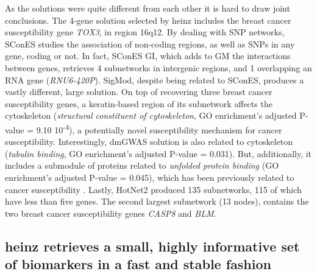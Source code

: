 \documentclass[twocolumn, 10pt]{article}
\begin{document}
As the solutions were quite different from each other it is hard to draw joint conclusions. The 4-gene solution selected by heinz includes the breast cancer susceptibility gene \emph{TOX3}, in region 16q12. By dealing with SNP networks, SConES studies the association of non-coding regions, as well as SNPs in any gene, coding or not. In fact, SConES GI, which adds to GM the interactions between genes, retrieves 4 subnetworks in intergenic regions, and 1 overlapping an RNA gene (\emph{RNU6-420P}). SigMod, despite being related to SConES, produces a vastly different, large solution. On top of recovering three breast cancer susceptibility genes, a keratin-based region of its subnetwork affects the cytoskeleton (\emph{structural constituent of cytoskeleton}, GO enrichment's adjusted P-value = 9.10 \texttimes{} 10\textsuperscript{-4}), a potentially novel susceptibility mechanism for cancer susceptibility. Interestingly, dmGWAS solution is also related to cytoskeleton (\emph{tubulin binding}, GO enrichment's adjusted P-value = 0.031). But, additionally, it includes a submodule of proteins related to \emph{unfolded protein binding} (GO enrichment's adjusted P-value = 0.045), which has been previously related to cancer susceptibility \cite{calderwood_heat_2016}. Lastly, HotNet2 produced 135 subnetworks, 115 of which have less than five genes. The second largest subnetwork (13 nodes), contains the two breast cancer susceptibility genes \emph{CASP8} and \emph{BLM}.

\subsection{heinz retrieves a small, highly informative set of biomarkers in a fast and stable fashion}
\label{sec:orgb834a56}
\end{document}
